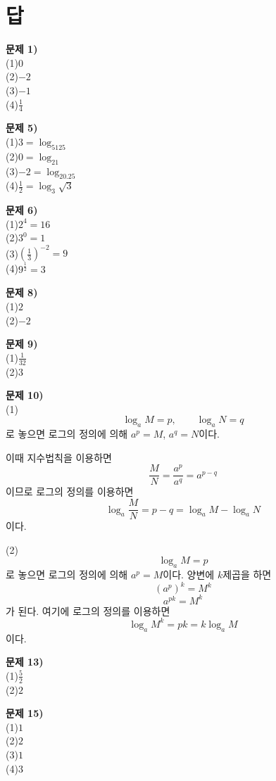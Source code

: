 \documentclass{oblivoir}
\newcommand\an[1]{\par\bigskip\noindent\textbf{문제 #1)}\\}
\let\oldsection\section
\renewcommand\section{\clearpage\oldsection}
\begin{document}
\section*{답}
\begin{minipage}{0.49\textwidth}
%
\an{1}
\noindent
(1)\:\:\(0\)\\
(2)\:\:\(-2\)\\
(3)\:\:\(-1\)\\
(4)\:\:\(\frac14\)

%
\an{5}
\noindent
(1)\:\:\(3=\log_5125\)\\
(2)\:\:\(0=\log_21\)\\
(3)\:\:\(-2=\log_20.25\)\\
(4)\:\:\(\frac12=\log_3\sqrt3\)

%
\an{6}
\noindent
(1)\:\:\(2^4=16\)\\
(2)\:\:\(3^0=1\)\\
(3)\:\:\(\left(\frac13\right)^{-2}=9\)\\
(4)\:\:\(9^{\frac12}=3\)

%
\an{8}
\noindent
(1)\:\:\(2\)\\
(2)\:\:\(-2\)

%
\an{9}
\noindent
(1)\:\:\(\frac1{32}\)\\
(2)\:\:\(3\)

%
\an{10}
(1) 
\[\log_aM=p,\qquad\log_aN=q\]
로 놓으면 로그의 정의에 의해 \(a^p=M\), \(a^q=N\)이다.
\end{minipage}
\begin{minipage}{0.49\textwidth}

이때 지수법칙을 이용하면
\[\frac MN=\frac{a^p}{a^q}=a^{p-q}\]
이므로 로그의 정의를 이용하면
\[\log_a\frac MN=p-q=\log_aM-\log_aN\]
이다.

(2)
\[\log_aM=p\]
로 놓으면 로그의 정의에 의해 \(a^p=M\)이다.
양변에 \(k\)제곱을 하면 \[(a^p)^k=M^k\] \[a^{pk}=M^k\]가 된다.
여기에 로그의 정의를 이용하면
\[\log_aM^k=pk=k\log_aM\]
이다.

%
\an{13}
\noindent
(1)\:\:\(\frac52\)\\
(2)\:\:\(2\)

%
\an{15}
\noindent
(1)\:\:\(1\)\\
(2)\:\:\(2\)\\
(3)\:\:\(1\)\\
(4)\:\:\(3\)

\end{minipage}
\end{document}
